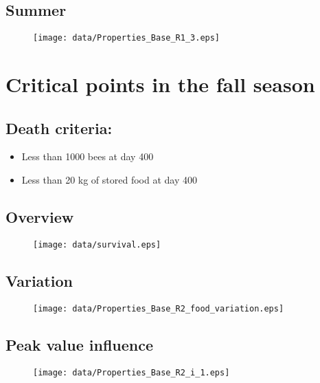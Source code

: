 \documentclass[
paper=128mm:96mm, %
fontsize=11pt, %
pagesize, %
parskip=half-, %
]{scrartcl} %
\theoremstyle{mythmstyle} %
\begin{document}
\subsection{Summer}
\begin{figure}[H]
			\centering
			\texttt{[image: data/Properties\_Base\_R1\_3.eps]}
\end{figure}
\clearpage

\section{Critical points in the fall season}
\subsection{Death criteria:}
\begin{itemize}
\item Less than 1000 bees at day 400
\item Less than 20 kg of stored food at day 400
\end{itemize}
\clearpage

\subsection{Overview}
\begin{figure}[H]
			\centering
			\texttt{[image: data/survival.eps]}
\end{figure}
\clearpage

\subsection{Variation}
\begin{figure}[H]
			\centering
			\texttt{[image: data/Properties\_Base\_R2\_food\_variation.eps]}
\end{figure}
\clearpage

\subsection{Peak value influence}
\begin{figure}[H]
			\centering
			\texttt{[image: data/Properties\_Base\_R2\_i\_1.eps]}
\end{figure}
\end{document}
